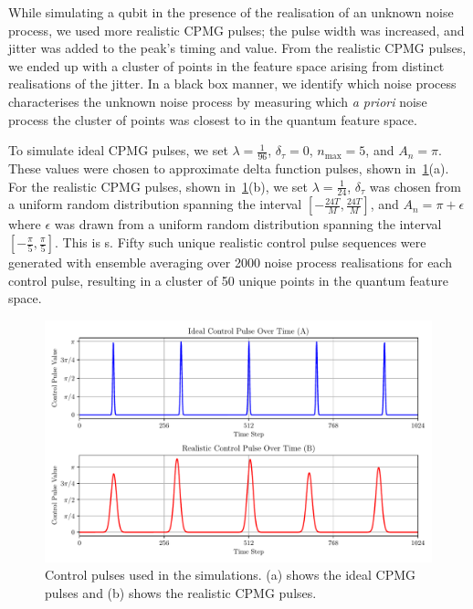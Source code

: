 \documentclass[12pt]{iopart}
\begin{document}
While simulating a qubit in the presence of the realisation of an unknown noise process, we used more realistic CPMG pulses; the pulse width was increased, and jitter was added to the peak's timing and value. From the realistic CPMG pulses, we ended up with a cluster of points in the feature space arising from distinct realisations of the jitter. In a black box manner, we identify which noise process characterises the unknown noise process by measuring which \textit{a priori} noise process the cluster of points was closest to in the quantum feature space.

To simulate ideal CPMG pulses, we set $\lambda = \frac{1}{96}$, $\delta_{\tau} = 0$, $n_{\max} = 5$, and $A_n = \pi$. These values were chosen to approximate delta function pulses, shown in~\cref{fig:control_pulses_visualisation}(a). For the realistic CPMG pulses, shown in~\cref{fig:control_pulses_visualisation}(b), we set $\lambda = \frac{1}{24}$, $\delta_{\tau}$ was chosen from a uniform random distribution spanning the interval $[-\frac{24T}{M}, \frac{24T}{M}]$, and $A_n = \pi + \epsilon$ where $\epsilon$ was drawn from a uniform random distribution spanning the interval $[-\frac{\pi}{5}, \frac{\pi}{5}]$. This is s. Fifty such unique realistic control pulse sequences were generated with ensemble averaging over 2000 noise process realisations for each control pulse, resulting in a cluster of 50 unique points in the quantum feature space.

\begin{figure}
    \centering
    \includegraphics[width=\textwidth]{figures/control_pulses.pdf}
    \caption{Control pulses used in the simulations. (a) shows the ideal CPMG pulses and (b) shows the realistic CPMG pulses.}
    \label{fig:control_pulses_visualisation}
\end{figure}
\end{document}
